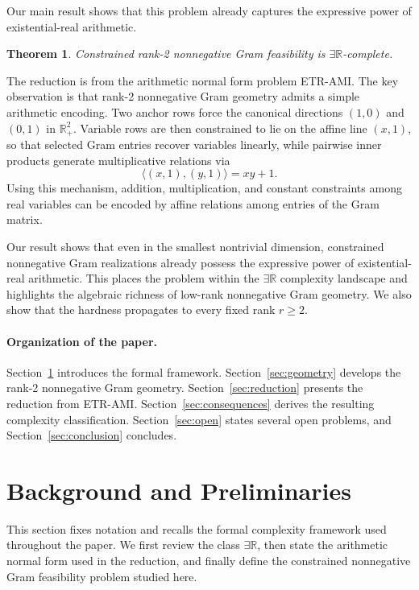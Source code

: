 \documentclass[11pt]{article}
\newtheorem{theorem}{Theorem}[section]
\begin{document}
Our main result shows that this problem already captures the expressive
power of existential-real arithmetic.

\begin{theorem}
\label{thm:intro-main}
Constrained rank-2 nonnegative Gram feasibility is
$\exists\mathbb{R}$-complete.
\end{theorem}

The reduction is from the arithmetic normal form problem \textsc{ETR-AMI}.
The key observation is that rank-2 nonnegative Gram geometry admits a
simple arithmetic encoding. Two anchor rows force the canonical
directions $(1,0)$ and $(0,1)$ in $\mathbb{R}_+^2$.
Variable rows are then constrained to lie on the affine line $(x,1)$,
so that selected Gram entries recover variables linearly,
while pairwise inner products generate multiplicative relations via
\[
\langle (x,1),(y,1)\rangle = xy + 1 .
\]
Using this mechanism, addition, multiplication, and constant constraints
among real variables can be encoded by affine relations among entries
of the Gram matrix.

Our result shows that even in the smallest nontrivial dimension,
constrained nonnegative Gram realizations already possess the expressive
power of existential-real arithmetic. This places the problem within the
$\exists\mathbb{R}$ complexity landscape and highlights the algebraic
richness of low-rank nonnegative Gram geometry.
We also show that the hardness propagates to every fixed rank $r\ge 2$.

\paragraph{Organization of the paper.}
Section~\ref{sec:background} introduces the formal framework.
Section~\ref{sec:geometry} develops the rank-2 nonnegative Gram geometry.
Section~\ref{sec:reduction} presents the reduction from \textsc{ETR-AMI}.
Section~\ref{sec:consequences} derives the resulting complexity classification.
Section~\ref{sec:open} states several open problems, and
Section~\ref{sec:conclusion} concludes.

\section{Background and Preliminaries}
\label{sec:background}

This section fixes notation and recalls the formal complexity framework used
throughout the paper. We first review the class $\exists\mathbb{R}$, then
state the arithmetic normal form used in the reduction, and finally define
the constrained nonnegative Gram feasibility problem studied here.
\end{document}
